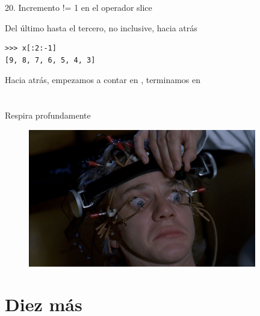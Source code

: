 \documentclass[14pt]{beamer}
\begin{document}
\begin{frame}[fragile]
  {20. \large Incremento != 1 en el operador slice}
  \begin{exampleblock}
    {Del último hasta el tercero, no inclusive, hacia atrás}
    \begin{lstlisting}
>>> x[:2:-1]
[9, 8, 7, 6, 5, 4, 3]
    \end{lstlisting}
  \end{exampleblock}

  \begin{alertblock}{}
    \small
    \centering
    Hacia atrás, empezamos a contar en , terminamos
    en 
  \end{alertblock}
\end{frame}

\section{}

\begin{frame}{}
  \begin{block}{}
    \centering \Large Respira profundamente
  \end{block}

  \begin{figure}
    \centering
    \includegraphics[height=6cm]{pics/a-clockwork-orange-2.jpg}
  \end{figure}
\end{frame}

\section{Diez más}
\end{document}

